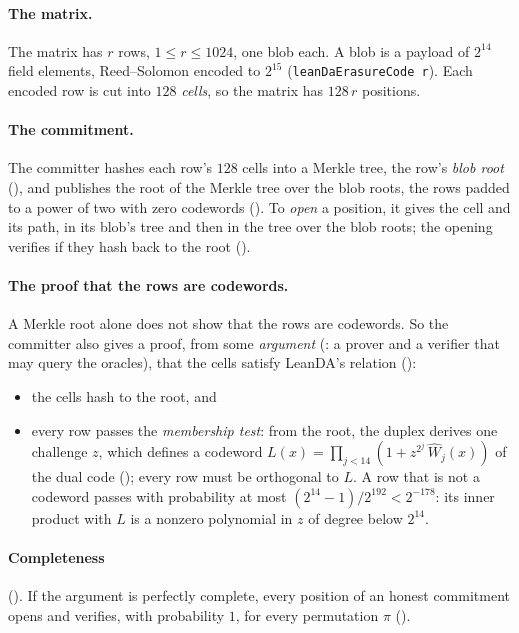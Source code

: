\documentclass[11pt]{article}
\begin{document}
\paragraph{The matrix.} The matrix has $r$ rows, $1 \le r \le 1024$, one blob each. A blob is a
payload of $2^{14}$ field elements, Reed--Solomon encoded to $2^{15}$
(\texttt{leanDaErasureCode r}). Each encoded row is cut into $128$ \emph{cells}, so the matrix has
$128\,r$ positions.

\paragraph{The commitment.} The committer hashes each row's $128$ cells into a Merkle tree, the
row's \emph{blob root} (), and publishes the root of the Merkle tree over the
blob roots, the rows padded to a power of two with zero codewords (). To
\emph{open} a position, it gives the cell and its path, in its blob's tree and then in the tree over
the blob roots; the opening verifies if they hash back to the root ().

\paragraph{The proof that the rows are codewords.} A Merkle root alone does not show that the rows
are codewords. So the committer also gives a proof, from some \emph{argument} (: a
prover and a verifier that may query the oracles), that the cells satisfy LeanDA's relation
():
\begin{itemize}
\item the cells hash to the root, and
\item every row passes the \emph{membership test}: from the root, the duplex derives one
challenge $z$, which defines a codeword $L(x) = \prod_{j<14} (1 + z^{2^j}\,\widehat{W}_j(x))$ of the
dual code (); every row must be orthogonal to $L$. A row that is not a codeword
passes with probability at most $(2^{14}-1)/2^{192} < 2^{-178}$: its inner product with $L$ is a
nonzero polynomial in $z$ of degree below $2^{14}$.
\end{itemize}

\paragraph{Completeness} (). If the argument is perfectly
complete, every position of an honest commitment opens and verifies, with probability $1$, for
every permutation $\pi$ ().
\end{document}
